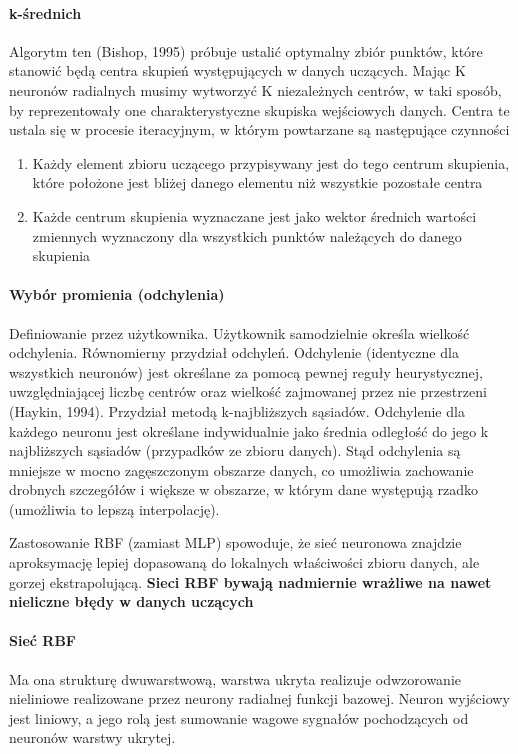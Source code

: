 \paragraph{ k-średnich} Algorytm ten (Bishop, 1995) próbuje ustalić optymalny 
zbiór punktów, które stanowić będą centra skupień występujących w danych 
uczących. Mając K neuronów radialnych musimy wytworzyć K niezależnych 
centrów, w taki sposób, by reprezentowały one charakterystyczne skupiska 
wejściowych danych. Centra te ustala się w procesie iteracyjnym, w którym 
powtarzane są następujące czynności
\begin{enumerate}
 \item Każdy element zbioru uczącego przypisywany jest do tego centrum 
skupienia, które położone jest bliżej danego elementu niż wszystkie pozostałe 
centra
 \item Każde centrum skupienia wyznaczane jest jako wektor średnich wartości 
zmiennych wyznaczony dla wszystkich punktów należących do danego 
skupienia
\end{enumerate}
 
 \paragraph{Wybór promienia (odchylenia)}
 
 Definiowanie przez użytkownika. Użytkownik samodzielnie określa wielkość
odchylenia.
Równomierny przydział odchyleń. Odchylenie (identyczne dla wszystkich 
neuronów) jest określane za pomocą pewnej reguły heurystycznej, 
uwzględniającej liczbę centrów oraz wielkość zajmowanej przez nie 
przestrzeni (Haykin, 1994).
Przydział metodą k-najbliższych sąsiadów. Odchylenie dla każdego 
neuronu jest określane indywidualnie jako średnia odległość do jego k 
najbliższych sąsiadów (przypadków ze zbioru danych). Stąd odchylenia są
mniejsze w mocno zagęszczonym obszarze danych, co umożliwia zachowanie 
drobnych szczegółów i większe w obszarze, w którym dane występują rzadko 
(umożliwia to lepszą interpolację).

Zastosowanie RBF (zamiast MLP) 
spowoduje, że sieć neuronowa znajdzie 
aproksymację lepiej dopasowaną do 
lokalnych właściwości zbioru danych, 
ale gorzej ekstrapolującą.
\textbf{Sieci RBF bywają nadmiernie wrażliwe 
na nawet nieliczne błędy w danych 
uczących}

\paragraph{Sieć RBF} Ma ona strukturę dwuwarstwową, warstwa ukryta realizuje odwzorowanie 
nieliniowe realizowane przez neurony radialnej funkcji bazowej. 
Neuron wyjściowy jest liniowy, a jego rolą jest sumowanie wagowe 
sygnałów pochodzących od neuronów warstwy ukrytej.

